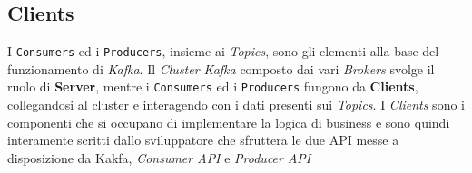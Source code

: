 \newpage
\subsection{Clients}
\label{subsec:kakfa_clients}
I \texttt{Consumers} ed i \texttt{Producers}, insieme ai \textit{Topics}, sono gli elementi alla base del funzionamento di \textit{Kafka}.
Il \textit{Cluster Kafka} composto dai vari \textit{Brokers} svolge il ruolo di \textbf{Server}, mentre i \texttt{Consumers} ed i \texttt{Producers} fungono da \textbf{Clients},
collegandosi al cluster e interagendo con i dati presenti sui \textit{Topics}.
I \textit{Clients} sono i componenti che si occupano di implementare la logica di business e sono quindi interamente scritti dallo sviluppatore che sfruttera le due API messe a disposizione da Kakfa,
\textit{Consumer API} e \textit{Producer API}

